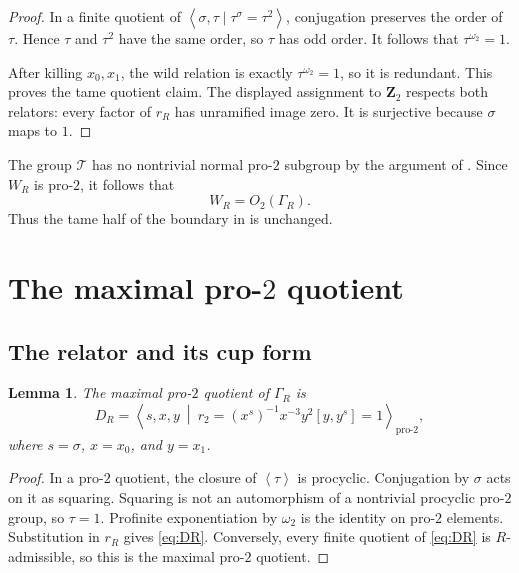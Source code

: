 \documentclass[11pt]{article}
\numberwithin{equation}{section}
\newtheorem{lemma}[theorem]{Lemma}
\theoremstyle{definition}
\theoremstyle{remark}
\newcommand{\Z}{\mathbf Z}
\newcommand{\rR}{r_R}
\newcommand{\GammaR}{\Gamma_R}
\newcommand{\TR}{\mathcal T}
\newcommand{\DR}{D_R}
\newcommand{\omegaTwo}{\omega_2}
\newcommand{\angles}[1]{\left\langle #1\right\rangle}
\begin{document}
\begin{proof}
In a finite quotient of
\(\angles{\sigma,\tau\mid\tau^\sigma=\tau^2}\), conjugation preserves the
order of \(\tau\).  Hence \(\tau\) and \(\tau^2\) have the same order, so
\(\tau\) has odd order.  It follows that \(\tau^{\omegaTwo}=1\).

After killing \(x_0,x_1\), the wild relation is exactly
\(\tau^{\omegaTwo}=1\), so it is redundant.  This proves the tame quotient
claim.  The displayed assignment to \(\Z_2\) respects both relators:
every factor of \(\rR\) has unramified image zero.  It is surjective because
\(\sigma\) maps to \(1\).
\end{proof}

The group \(\TR\) has no nontrivial normal pro-\(2\) subgroup by the argument
of \cite[Lemma~3.3]{RT}.  Since \(W_R\) is pro-\(2\), it follows that
\[
  W_R=O_2(\GammaR).
\]
Thus the tame half of the boundary in \cite[\S4]{RT} is unchanged.

\section{\texorpdfstring{The maximal pro-\(2\) quotient}{The maximal pro-2 quotient}}

\subsection{The relator and its cup form}

\begin{lemma}\label{lem:pro2word}
The maximal pro-\(2\) quotient of \(\GammaR\) is
\begin{equation}\label{eq:DR}
  \DR=
  \angles{s,x,y\ \middle|\ 
  r_2=(x^s)^{-1}x^{-3}y^2[y,y^s]=1}_{\mathrm{pro}\text{-}2},
\end{equation}
where \(s=\sigma\), \(x=x_0\), and \(y=x_1\).
\end{lemma}

\begin{proof}
In a pro-\(2\) quotient, the closure of \(\angles{\tau}\) is procyclic.
Conjugation by \(\sigma\) acts on it as squaring.  Squaring is not an
automorphism of a nontrivial procyclic pro-\(2\) group, so \(\tau=1\).
Profinite exponentiation by \(\omegaTwo\) is the identity on pro-\(2\)
elements.  Substitution in \(\rR\) gives \cref{eq:DR}.  Conversely, every
finite quotient of \cref{eq:DR} is \(R\)-admissible, so this is the maximal
pro-\(2\) quotient.
\end{proof}
\end{document}
